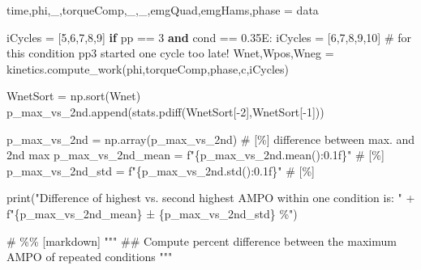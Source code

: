 \documentclass[
  11pt,
  a4paper]{article}
\newenvironment{Shaded}{\begin{snugshade}}{\end{snugshade}}
\newcommand{\BuiltInTok}[1]{\textcolor[rgb]{0.00,0.23,0.31}{#1}}
\newcommand{\CommentTok}[1]{\textcolor[rgb]{0.37,0.37,0.37}{#1}}
\newcommand{\ControlFlowTok}[1]{\textcolor[rgb]{0.00,0.23,0.31}{\textbf{#1}}}
\newcommand{\DecValTok}[1]{\textcolor[rgb]{0.68,0.00,0.00}{#1}}
\newcommand{\KeywordTok}[1]{\textcolor[rgb]{0.00,0.23,0.31}{\textbf{#1}}}
\newcommand{\NormalTok}[1]{\textcolor[rgb]{0.00,0.23,0.31}{#1}}
\newcommand{\OperatorTok}[1]{\textcolor[rgb]{0.37,0.37,0.37}{#1}}
\newcommand{\SpecialCharTok}[1]{\textcolor[rgb]{0.37,0.37,0.37}{#1}}
\newcommand{\SpecialStringTok}[1]{\textcolor[rgb]{0.13,0.47,0.30}{#1}}
\newcommand{\StringTok}[1]{\textcolor[rgb]{0.13,0.47,0.30}{#1}}
\begin{document}
\begin{Shaded}
\begin{Highlighting}[]
\NormalTok{        time,phi,\_,torqueComp,\_,\_,emgQuad,emgHams,phase }\OperatorTok{=}\NormalTok{ data}
        
\NormalTok{        iCycles }\OperatorTok{=}\NormalTok{ [}\DecValTok{5}\NormalTok{,}\DecValTok{6}\NormalTok{,}\DecValTok{7}\NormalTok{,}\DecValTok{8}\NormalTok{,}\DecValTok{9}\NormalTok{]}
        \ControlFlowTok{if}\NormalTok{ pp }\OperatorTok{==} \DecValTok{3} \KeywordTok{and}\NormalTok{ cond }\OperatorTok{==} \StringTok{\textquotesingle{}0.35E\textquotesingle{}}\NormalTok{:}
\NormalTok{            iCycles }\OperatorTok{=}\NormalTok{ [}\DecValTok{6}\NormalTok{,}\DecValTok{7}\NormalTok{,}\DecValTok{8}\NormalTok{,}\DecValTok{9}\NormalTok{,}\DecValTok{10}\NormalTok{] }\CommentTok{\# for this condition pp3 started one cycle too late!}
\NormalTok{        Wnet,Wpos,Wneg }\OperatorTok{=}\NormalTok{ kinetics.compute\_work(phi,torqueComp,phase,}\StringTok{\textquotesingle{}c\textquotesingle{}}\NormalTok{,iCycles)}
               
\NormalTok{        WnetSort }\OperatorTok{=}\NormalTok{ np.sort(Wnet)}
\NormalTok{        p\_max\_vs\_2nd.append(stats.pdiff(WnetSort[}\OperatorTok{{-}}\DecValTok{2}\NormalTok{],WnetSort[}\OperatorTok{{-}}\DecValTok{1}\NormalTok{]))}
        
\NormalTok{p\_max\_vs\_2nd }\OperatorTok{=}\NormalTok{ np.array(p\_max\_vs\_2nd) }\CommentTok{\# [\%] difference between max. and 2nd max}
\NormalTok{p\_max\_vs\_2nd\_mean }\OperatorTok{=} \SpecialStringTok{f"}\SpecialCharTok{\{}\NormalTok{p\_max\_vs\_2nd}\SpecialCharTok{.}\NormalTok{mean()}\SpecialCharTok{:0.1f\}}\SpecialStringTok{"}  \CommentTok{\# [\%] }
\NormalTok{p\_max\_vs\_2nd\_std  }\OperatorTok{=} \SpecialStringTok{f"}\SpecialCharTok{\{}\NormalTok{p\_max\_vs\_2nd}\SpecialCharTok{.}\NormalTok{std()}\SpecialCharTok{:0.1f\}}\SpecialStringTok{"}  \CommentTok{\# [\%] }

\BuiltInTok{print}\NormalTok{(}\StringTok{"Difference of highest vs. second highest AMPO within one condition is: "} \OperatorTok{+}
      \SpecialStringTok{f"}\SpecialCharTok{\{}\NormalTok{p\_max\_vs\_2nd\_mean}\SpecialCharTok{\}}\SpecialStringTok{ ± }\SpecialCharTok{\{}\NormalTok{p\_max\_vs\_2nd\_std}\SpecialCharTok{\}}\SpecialStringTok{ \%"}\NormalTok{)}

\CommentTok{\# \%\% [markdown]}
\CommentTok{"""}
\CommentTok{\#\# Compute percent difference between the maximum AMPO of repeated conditions}
\CommentTok{"""}


\end{Highlighting}
\end{Shaded}
\end{document}
